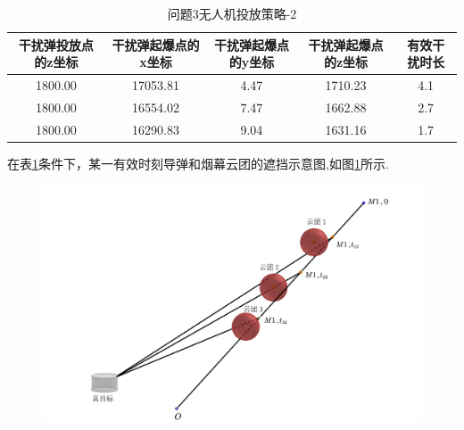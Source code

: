 \documentclass[../main.tex]{subfiles}
\begin{document}
\begin{table}[H]
\caption{问题3无人机投放策略-2}
\label{tab:031} 
\centering
\begin{small}
\begin{tabular}{ccccc}
\toprule[1.5pt]
干扰弹投放点的z坐标 &干扰弹起爆点的x坐标&干扰弹起爆点的y坐标&干扰弹起爆点的z坐标&有效干扰时长\\
\midrule[1pt]
1800.00             &17053.81                   & 4.47    &1710.23        & 4.1  \\               
1800.00             &16554.02                   & 7.47    & 1662.88       & 2.7  \\               
1800.00             &16290.83                   & 9.04    & 1631.16       & 1.7  \\                
\bottomrule[1.5pt]
\end{tabular}
\end{small}
\end{table}

在表\ref{tab:031}条件下，某一有效时刻导弹和烟幕云团的遮挡示意图,如图\ref{图......2}所示.
\begin{figure}[H]
\centering
\includegraphics[scale=0.5]{图二.png}
\caption{}
\label{图......2}
\end{figure}
\end{document}

